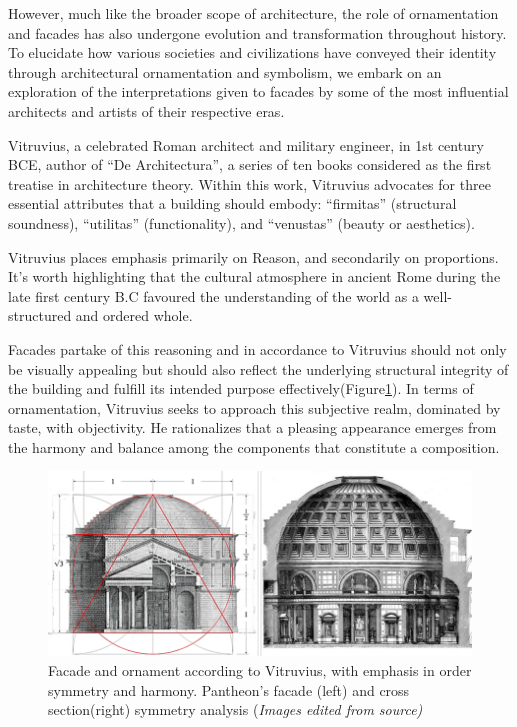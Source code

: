 However, much like the broader scope of architecture, the role of ornamentation and facades has also undergone evolution and transformation throughout history.
To elucidate how various societies and civilizations have conveyed their identity through architectural ornamentation and symbolism, we embark on an exploration of the interpretations given to facades by some of the most influential architects and artists of their respective eras.


Vitruvius, a celebrated Roman architect and military engineer, in 1st century BCE, author of ``De Architectura'', a series of ten books considered as the first treatise in architecture theory\cite{Kruft1994}.
Within this work, Vitruvius advocates for three essential attributes that a building should embody: ``firmitas'' (structural soundness), ``utilitas'' (functionality), and ``venustas'' (beauty or aesthetics)\cite{Ostwald2023}.

Vitruvius places emphasis primarily on Reason, and secondarily on proportions.
It's worth highlighting that the cultural atmosphere in ancient Rome during the late first century B.C favoured the understanding of the world as a well-structured and ordered whole\cite{Lefas2000}.

Facades partake of this reasoning and in accordance to Vitruvius should not only be visually appealing but should also reflect the underlying structural integrity of the building and fulfill its intended purpose effectively(Figure\ref{fig:Vitruvianarchitecture}).
In terms of ornamentation, Vitruvius seeks to approach this subjective realm, dominated by taste, with objectivity.
He rationalizes that a pleasing appearance emerges from the harmony and balance among the components that constitute a composition\cite{Lefas2000}.

    \begin{figure}[htb]
        \centering
        \includegraphics[width= \linewidth]{Images/VitruvianArchitecture}
        \caption{Facade and ornament according to Vitruvius, with emphasis in order symmetry and harmony. Pantheon's facade (left) and cross section(right) symmetry analysis (\textit{Images edited from source)}}
        \label{fig:Vitruvianarchitecture}
    \end{figure}

